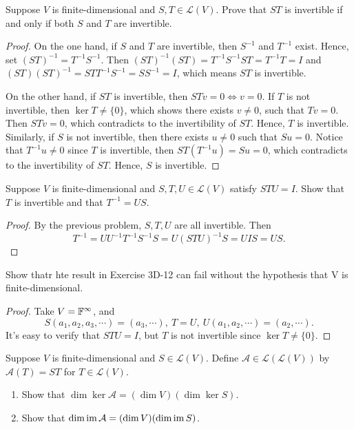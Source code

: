 \documentclass{article}
\begin{document}
\begin{problem}[3D-11]
    Suppose \( V \) is finite-dimensional and \( S,T\in\mathcal{L}(V) \). Prove that
    \( ST \) is invertible if and only if both \( S \) and \( T \) are invertible.
\end{problem}

\begin{proof}
    On the one hand, if \( S \) and \( T \) are invertible, then \( S^{-1} \) and \( T^{-1} \) exist. Hence, set \( (ST)^{-1}=T^{-1}S^{-1} \). Then \( (ST)^{-1}(ST)=T^{-1}S^{-1}ST=T^{-1}T=I \) and \( (ST)(ST)^{-1}=STT^{-1}S^{-1}=SS^{-1}=I \), which means \( ST \) is invertible. \par
    On the other hand, if \( ST \) is invertible, then \( STv=0\iff v=0 \). If \( T \) is not invertible, then \( \ker T\neq\{0\} \), which shows there exists \( v\neq 0 \), such that \( Tv=0 \). Then \( STv=0 \), which contradicts to the invertibility of \( ST \). Hence, \( T \) is invertible. Similarly, if \( S \) is not invertible, then there exists \( u\neq 0 \) such that \( Su=0 \). Notice that \( T^{-1}u\neq 0 \) since \( T  \) is invertible, then \( ST(T^{-1}u)=Su=0 \), which contradicts to the invertibility of \( ST \). Hence, \( S \) is invertible.
\end{proof}

\begin{problem}[3D-12]
    Suppose \( V \) is finite-dimensional and \( S,T,U\in\mathcal{L}(V) \) satisfy \( STU=I \). Show that \( T \) is invertible and that \( T^{-1}=US \).
\end{problem}

\begin{proof}
    By the previous problem, \( S,T,U \) are all invertible. Then
    \[ T^{-1}=UU^{-1}T^{-1}S^{-1}S=U(STU)^{-1}S=UIS=US. \] 
\end{proof}

\begin{problem}[3D-13]
    Show thatr hte result in Exercise 3D-12 can fail without the hypothesis that V is finite-dimensional.
\end{problem}

\begin{proof}
    Take \( V=\mathbb{F}^\infty \), and 
    \[ S(a_1,a_2,a_3,\cdots)=(a_3,\cdots),\ T=U,\ U(a_1,a_2,\cdots) =(a_2,\cdots). \]
    It's easy to verify that \( STU=I \), but \( T \) is not invertible since \( \ker T\neq\{0\} \). 
\end{proof}

\begin{problem}[3D-17]
    Suppose \( V \) is finite-dimensional and \( S\in\mathcal{L}(V) \). Define \( \mathcal{A}\in\mathcal{L}(\mathcal{L}(V)) \) by
    \( \mathcal{A}(T)=ST \) for \( T\in\mathcal{L}(V) \).
    \begin{enumerate}[label=\textup{(\alph*)}]
        \item Show that \( \dim\ker\mathcal{A}=(\dim V)(\dim\ker S) \).
        \item Show that \( \dim\operatorname{im}\mathcal{A}=(\dim V)(\dim\operatorname{im} S) \).
    \end{enumerate}
\end{problem}
\end{document}
